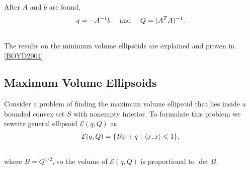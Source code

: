 \documentclass[letterpaper,10pt,english]{sphinxmanual}
\begin{document}
After $A$ and $b$ are found,
\begin{gather}
\begin{split}q=-A^{-1}b ~~~ \mbox{ and } ~~~ Q=(A^TA)^{-1}.\end{split}\notag\\\begin{split}\end{split}\notag
\end{gather}
The results on the minimum volume ellipsoids are explained and proven in
{\hyperref[chap_ellcalc:boyd2004]{{[}BOYD2004{]}}}.


\subsection{Maximum Volume Ellipsoids}
\label{chap_ellcalc:maximum-volume-ellipsoids}
Consider a problem of finding the maximum volume ellipsoid that lies
inside a bounded convex set $S$ with nonempty interior. To
formulate this problem we rewrite general ellipsoid
${\mathcal E}(q,Q)$ as
\begin{gather}
\begin{split}{\mathcal E}(q,Q) = \{Bx + q ~|~ \langle x,x\rangle\leqslant1\},\end{split}\notag\\\begin{split}\end{split}\notag
\end{gather}
where $B=Q^{1/2}$, so the volume of ${\mathcal E}(q,Q)$ is
proportional to $\det B$.
\end{document}
